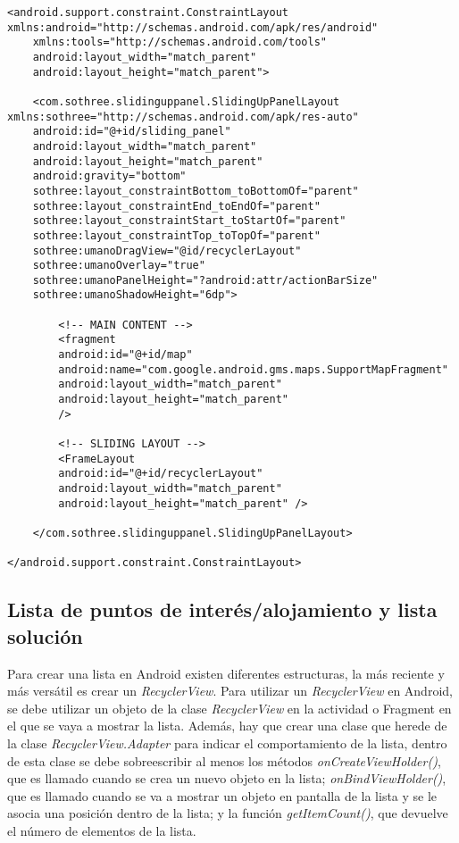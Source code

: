 \begin{lstlisting}[caption=Código XML de la vista de la actividad principal]
<android.support.constraint.ConstraintLayout xmlns:android="http://schemas.android.com/apk/res/android"
	xmlns:tools="http://schemas.android.com/tools"
	android:layout_width="match_parent"
	android:layout_height="match_parent">

	<com.sothree.slidinguppanel.SlidingUpPanelLayout xmlns:sothree="http://schemas.android.com/apk/res-auto"
	android:id="@+id/sliding_panel"
	android:layout_width="match_parent"
	android:layout_height="match_parent"
	android:gravity="bottom"
	sothree:layout_constraintBottom_toBottomOf="parent"
	sothree:layout_constraintEnd_toEndOf="parent"
	sothree:layout_constraintStart_toStartOf="parent"
	sothree:layout_constraintTop_toTopOf="parent"
	sothree:umanoDragView="@id/recyclerLayout"
	sothree:umanoOverlay="true"
	sothree:umanoPanelHeight="?android:attr/actionBarSize"
	sothree:umanoShadowHeight="6dp">

		<!-- MAIN CONTENT -->
		<fragment
		android:id="@+id/map"
		android:name="com.google.android.gms.maps.SupportMapFragment"
		android:layout_width="match_parent"
		android:layout_height="match_parent"
		/>
		
		<!-- SLIDING LAYOUT -->
		<FrameLayout
		android:id="@+id/recyclerLayout"
		android:layout_width="match_parent"
		android:layout_height="match_parent" />
	
	</com.sothree.slidinguppanel.SlidingUpPanelLayout>

</android.support.constraint.ConstraintLayout>
\end{lstlisting}
\subsection{Lista de puntos de interés/alojamiento y lista solución}
Para crear una lista en Android existen diferentes estructuras, la más reciente y más versátil es crear un \textit{RecyclerView}. Para utilizar un \textit{RecyclerView} en Android, se debe utilizar un objeto de la clase \textit{RecyclerView} en la actividad o Fragment en el que se vaya a mostrar la lista. Además, hay que crear una clase que herede de la clase \textit{RecyclerView.Adapter} para indicar el comportamiento de la lista, dentro de esta clase se debe sobreescribir al menos los métodos \textit{onCreateViewHolder()}, que es llamado cuando se crea un nuevo objeto en la lista; \textit{onBindViewHolder()}, que es llamado cuando se va a mostrar un objeto en pantalla de la lista y se le asocia una posición dentro de la lista; y la función \textit{getItemCount()}, que devuelve el número de elementos de la lista.\newline

